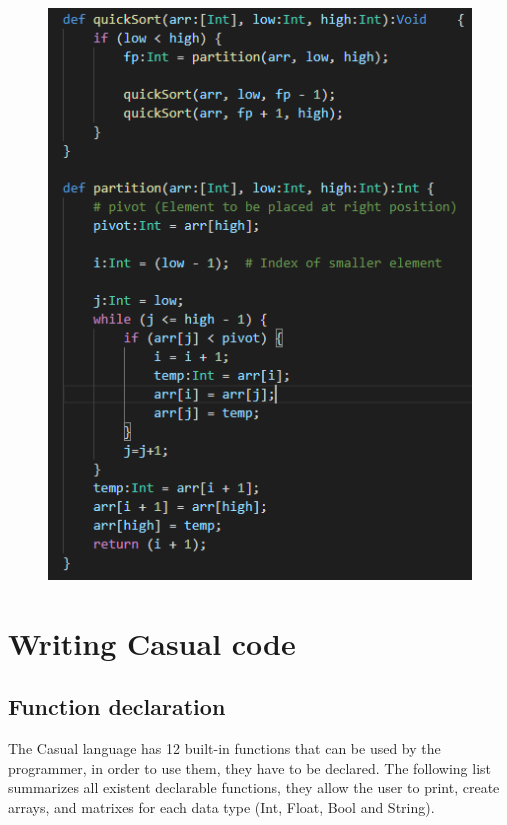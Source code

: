 \documentclass[12pt]{article}
\begin{document}
\begin{figure}[htb]
  	\centering
  	\includegraphics[scale=0.9]{quicksort.png}
\end{figure}
\newpage

\section{Writing Casual code}
\subsection{Function declaration}
The Casual language has 12 built-in functions that can be used by the programmer, in order to use them, they have to be declared. The following list summarizes all existent declarable functions, they allow the user to print, create arrays, and matrixes for each data type (Int, Float, Bool and String). \\
\end{document}
